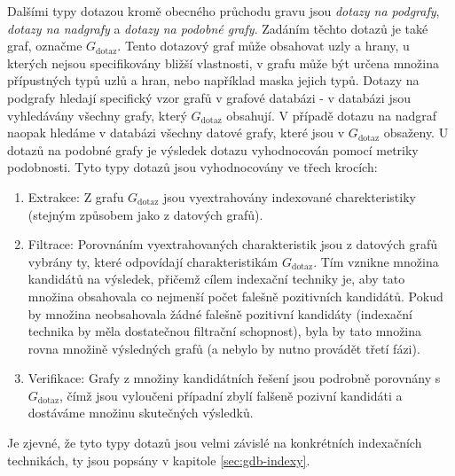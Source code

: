 
Dalšími typy dotazou kromě obecného průchodu gravu jsou \textit{dotazy na podgrafy}, \textit{dotazy na nadgrafy} a \textit{dotazy na podobné grafy}. Zadáním těchto dotazů je také graf, označme \textit{$G_\mathrm{dotaz}$}. Tento dotazový graf může obsahovat uzly a hrany, u kterých nejsou specifikovány bližší vlastnosti, v grafu může být určena množina přípustných typů uzlů a hran, nebo například maska jejich typů. Dotazy na podgrafy hledají specifický vzor grafů v grafové databázi - v databázi jsou vyhledávány všechny grafy, který \textit{$G_\mathrm{dotaz}$} obsahují. V případě dotazu na nadgraf naopak hledáme v databázi všechny datové grafy, které jsou v \textit{$G_\mathrm{dotaz}$} obsaženy. U dotazů na podobné grafy je výsledek dotazu vyhodnocován pomocí metriky podobnosti.\cite{Koutra11} Tyto typy dotazů jsou vyhodnocovány ve třech krocích: 

\begin{enumerate}
	\item{Extrakce:} Z grafu \textit{$G_\mathrm{dotaz}$} jsou vyextrahovány indexované charekteristiky (stejným způsobem jako z datových grafů).
	\item{Filtrace:} Porovnáním vyextrahovaných charakteristik jsou z datových grafů vybrány ty, které odpovídají charakteristikám \textit{$G_\mathrm{dotaz}$}. Tím vznikne množina kandidátů na výsledek, přičemž cílem indexační techniky je, aby tato množina obsahovala co nejmenší počet falešně pozitivních kandidátů. Pokud by množina neobsahovala žádné falešně pozitivní kandidáty (indexační technika by měla dostatečnou filtrační schopnost), byla by tato množina rovna množině výsledných grafů (a nebylo by nutno provádět třetí fázi). 
	\item{Verifikace:} Grafy z množiny kandidátních řešení jsou podrobně porovnány s \textit{$G_\mathrm{dotaz}$}, čímž jsou vyloučeni případní zbylí falšeně pozivní kandidáti a dostáváme množinu skutečných výsledků. 
\end{enumerate}

Je zjevné, že tyto typy dotazů jsou velmi závislé na konkrétních indexačních technikách, ty jsou popsány v kapitole \ref{sec:gdb-indexy}.


